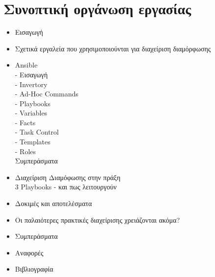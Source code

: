 \documentclass[a4paper,12pt]{article}
\begin{document}
\section{Συνοπτική οργάνωση εργασίας}
\begin{itemize}
    \item Εισαγωγή
    \item Σχετικά εργαλεία που χρησιμοποιούνται για διαχείριση διαμόρφωσης 
    \item Ansible \\
        - Εισαγωγή\\
        - Invertory\\
        - Ad-Hoc Commands\\
        - Playbooks\\
        - Variables\\
        - Facts\\
        - Task Control\\
        - Templates\\
        - Roles\\
     Συμπεράσματα
    \item Διαχείριση Διαμόφωσης στην πράξη\\
        3 Playbooks - και πως λειτουργούν 
    \item Δοκιμές και αποτελέσματα
    \item Oι παλαιότερες πρακτικές διαχείρισης χρειάζονται ακόμα?
    \item Συμπεράσματα 
    \item Αναφορές
    \item Βιβλιογραφία
\end{itemize}
\end{document}
